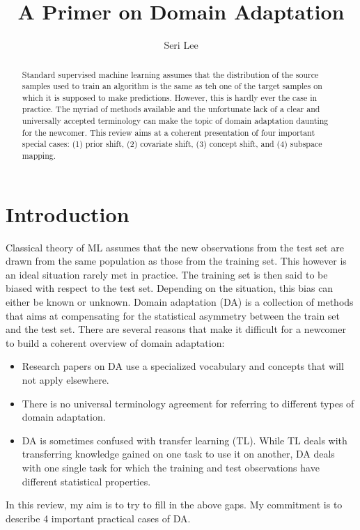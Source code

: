 \documentclass{tufte-handout}
\title{A Primer on Domain Adaptation}
\author[Seri Lee]{Seri Lee}
\begin{document}
\maketitle%

\begin{abstract}
\noindent
Standard supervised machine learning assumes that the distribution of the source samples used to train an algorithm is the same as teh one of the target samples on which it is supposed to make predictions.
However, this is hardly ever the case in practice. The myriad of methods available and the unfortunate lack of a clear and universally accepted terminology can make the topic of domain adaptation daunting for the newcomer.
This review aims at a coherent presentation of four important special cases: (1) prior shift, (2) covariate shift, (3) concept shift, and (4) subspace mapping. 
\end{abstract}


\section{Introduction}
Classical theory of ML assumes that the new observations from the test set are drawn from the same population as those from the training set.
This however is an ideal situation rarely met in practice. The training set is then said to be biased with respect to the test set.
Depending on the situation, this bias can either be known or unknown. Domain adaptation (DA) is a collection of methods that aims at compensating for the statistical asymmetry between the train set and the test set.
There are several reasons that make it difficult for a newcomer to build a coherent overview of domain adaptation:
\begin{itemize}
  \item Research papers on DA use a specialized vocabulary and concepts that will not apply elsewhere.
  \item There is no universal terminology agreement for referring to different types of domain adaptation.
  \item DA is sometimes confused with transfer learning (TL). 
  While TL deals with transferring knowledge gained on one task to use it on another, DA deals with one single task for which the training and test observations have different statistical properties.
\end{itemize}
In this review, my aim is to try to fill in the above gaps. My commitment is to describe 4 important practical cases of DA. 
\end{document}
